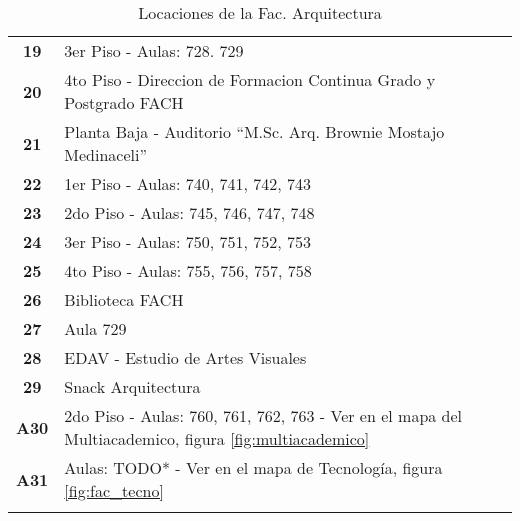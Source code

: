 \begin{longtable}{ c  X }
\textbf{19}
&
3{\tiny er} Piso - Aulas: 728. 729
\\



\textbf{20}
&
4{\tiny to} Piso - Direccion de Formacion Continua Grado y Postgrado FACH
\\



\textbf{21}
&
Planta Baja - Auditorio ``M.Sc. Arq. Brownie Mostajo Medinaceli''
\\



\textbf{22}
&
1{\tiny er} Piso - Aulas: 740, 741, 742, 743
\\




\textbf{23}
&
2{\tiny do} Piso - Aulas: 745, 746, 747, 748
\\




\textbf{24}
&
3{\tiny er} Piso - Aulas: 750, 751, 752, 753
\\

\textbf{25}
&
4{\tiny to} Piso - Aulas: 755, 756, 757, 758
\\


\textbf{26}
&
Biblioteca FACH
\\

\textbf{27}
&
Aula 729
\\

\textbf{28}
&
EDAV - Estudio de Artes Visuales
\\

\textbf{29}
&
Snack Arquitectura
\\

\textbf{A30}
&
2{\tiny do} Piso - Aulas: 760, 761, 762, 763 - Ver en el mapa del Multiacademico, figura \ref{fig:multiacademico}
\\

\textbf{A31}
&
Aulas: TODO* - Ver en el mapa de Tecnología, figura \ref{fig:fac_tecno}
\\


      \bottomrule
      \caption{Locaciones de la Fac. Arquitectura}
      \label{tab:lugares_arquitectura}
    \end{longtable}
